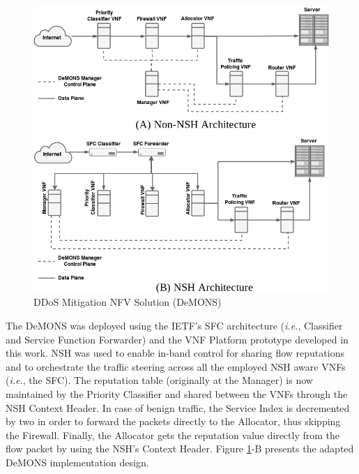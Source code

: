 \begin{figure}[!h]
\centering
\includegraphics[width=.8\textwidth]{images/DeMONS.png}
\caption{DDoS Mitigation NFV Solution (DeMONS)}
\label{FIG:DeMONS}
\end{figure}


The DeMONS was deployed using the IETF's SFC architecture (\textit{i.e.}, Classifier and Service Function Forwarder) \cite{Joel-2015} and the VNF Platform prototype developed in this work. NSH was used to enable in-band control for sharing flow reputations and to orchestrate the traffic steering across all the employed NSH aware VNFs (\textit{i.e.}, the SFC). The reputation table (originally at the Manager) is now maintained by the Priority Classifier and shared between the VNFs through the NSH Context Header. In case of benign traffic, the Service Index is decremented by two in order to forward the packets directly to the Allocator, thus skipping the Firewall. Finally, the Allocator gets the reputation value directly from the flow packet by using the NSH's Context Header. Figure \ref{FIG:DeMONS}-B presents the adapted DeMONS implementation design.

